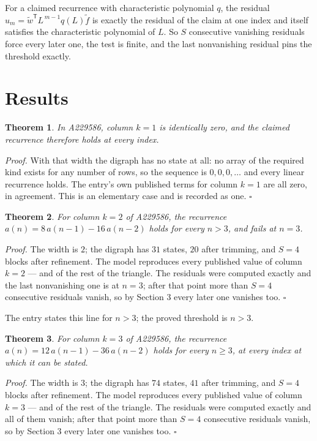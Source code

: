 \documentclass[11pt]{article}
\newtheorem{theorem}{Theorem}
\theoremstyle{definition}
\begin{document}
For a claimed recurrence with characteristic polynomial $q$, the residual $u_m = \tilde w^{\mathsf T}L^{\,m-1}q(L)\tilde f$ is exactly the residual of the claim at one index and itself satisfies the characteristic polynomial of $L$. So $S$ consecutive vanishing residuals force every later one, the test is finite, and the last nonvanishing residual pins the threshold exactly.

\section{Results}

\begin{theorem} In A229586, column $k = 1$ is identically zero, and the claimed recurrence therefore holds at every index.\end{theorem}

{\itshape Proof.} With that width the digraph has no state at all: no array of the required kind exists for any number of rows, so the sequence is $0,0,0,\dots$ and every linear recurrence holds. The entry's own published terms for column $k = 1$ are all zero, in agreement. This is an elementary case and is recorded as one. $\square$

\begin{theorem} For column $k = 2$ of A229586, the recurrence $a(n) = 8\,a(n-1) - 16\,a(n-2)$ holds for every $n > 3$, and fails at $n = 3$.\end{theorem}

{\itshape Proof.} The width is $2$; the digraph has $31$ states, $20$ after trimming, and $S = 4$ blocks after refinement. The model reproduces every published value of column $k = 2$ --- and of the rest of the triangle. The residuals were computed exactly and the last nonvanishing one is at $n = 3$; after that point more than $S = 4$ consecutive residuals vanish, so by Section 3 every later one vanishes too. $\square$

The entry states this line for $n > 3$; the proved threshold is $n > 3$.

\begin{theorem} For column $k = 3$ of A229586, the recurrence $a(n) = 12\,a(n-1) - 36\,a(n-2)$ holds for every $n \ge 3$, at every index at which it can be stated.\end{theorem}

{\itshape Proof.} The width is $3$; the digraph has $74$ states, $41$ after trimming, and $S = 4$ blocks after refinement. The model reproduces every published value of column $k = 3$ --- and of the rest of the triangle. The residuals were computed exactly and all of them vanish; after that point more than $S = 4$ consecutive residuals vanish, so by Section 3 every later one vanishes too. $\square$
\end{document}
